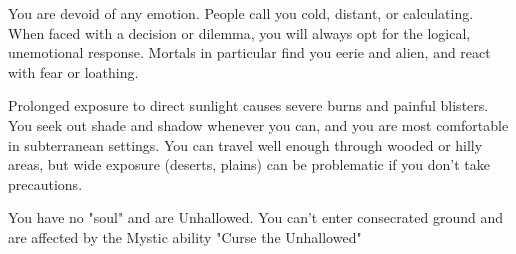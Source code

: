{  



  You are devoid of any emotion.  People call you cold, distant, or calculating.  When faced with a decision or dilemma, you will always opt for the logical, unemotional response.  Mortals in particular find you eerie and alien, and react with fear or loathing.



  Prolonged exposure to direct sunlight causes severe burns and painful blisters.  You seek out shade and shadow whenever you can, and you are most comfortable in subterranean settings.  You can travel well enough through wooded or hilly areas, but wide exposure (deserts, plains) can be problematic if you don't take precautions.


    
  You have no "soul" and are Unhallowed. You can't enter consecrated ground and are affected by the Mystic ability "Curse the Unhallowed"

  \cbreak






\newpage




}

